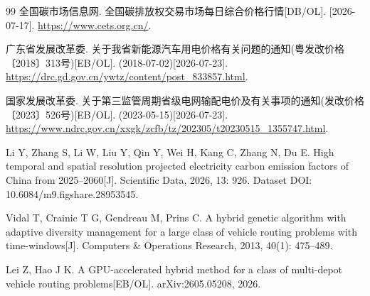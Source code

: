 \documentclass{setp-new}
\begin{document}
\begin{thebibliography}{99}
 全国碳市场信息网. 全国碳排放权交易市场每日综合价格行情[DB/OL]. [2026-07-17]. \url{https://www.cets.org.cn/}.

 广东省发展改革委. 关于我省新能源汽车用电价格有关问题的通知(粤发改价格〔2018〕313号)[EB/OL]. (2018-07-02)[2026-07-23].
\url{https://drc.gd.gov.cn/ywtz/content/post_833857.html}.

 国家发展改革委. 关于第三监管周期省级电网输配电价及有关事项的通知(发改价格〔2023〕526号)[EB/OL]. (2023-05-15)[2026-07-23].
\url{https://www.ndrc.gov.cn/xxgk/zcfb/tz/202305/t20230515_1355747.html}.

 Li Y, Zhang S, Li W, Liu Y, Qin Y, Wei H, Kang C, Zhang N, Du E. High temporal and spatial resolution projected electricity carbon emission factors of China from 2025--2060[J]. Scientific Data, 2026, 13: 926. Dataset DOI: 10.6084/m9.figshare.28953545.

 Vidal T, Crainic T G, Gendreau M, Prins C. A hybrid genetic algorithm with adaptive diversity management for a large class of vehicle routing problems with time-windows[J]. Computers \& Operations Research, 2013, 40(1): 475--489.

 Lei Z, Hao J K. A GPU-accelerated hybrid method for a class of multi-depot vehicle routing problems[EB/OL]. arXiv:2605.05208, 2026.

\end{thebibliography}
\end{document}
